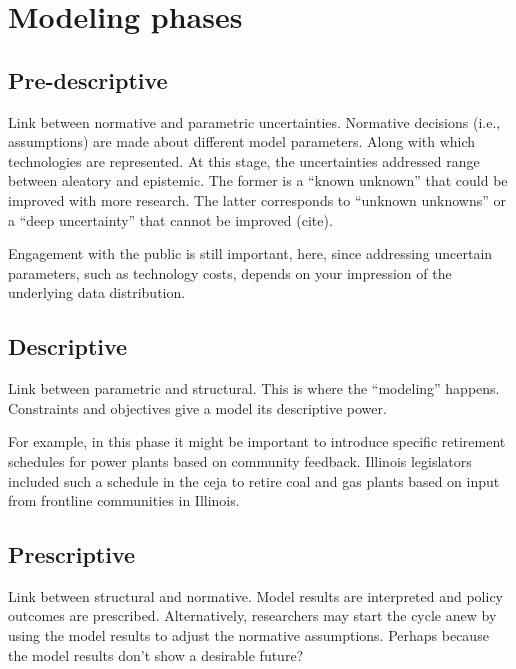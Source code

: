 \section{Modeling phases}
\label{section:modeling-phases}

\subsection{Pre-descriptive}

Link between normative and parametric uncertainties. Normative decisions (i.e.,
assumptions) are made about different model parameters. Along with which
technologies are represented. At this stage, the uncertainties addressed range
between aleatory and epistemic. The former is a ``known unknown'' that could be
improved with more research. The latter corresponds to ``unknown unknowns'' or a
``deep uncertainty'' that cannot be improved (cite).

Engagement with the public is still important, here, since addressing uncertain
parameters, such as technology costs, depends on your impression of the
underlying data distribution.


\subsection{Descriptive}
Link between parametric and structural. This is where the ``modeling'' happens.
Constraints and objectives give a model its descriptive power.

For example, in this phase it might be important to introduce specific
retirement schedules for power plants based on community feedback. Illinois
legislators included such a schedule in the \acf{ceja} to retire coal and gas
plants based on input from frontline communities in Illinois.

\subsection{Prescriptive}
Link between structural and normative. Model results are interpreted and policy
outcomes are prescribed. Alternatively, researchers may start the cycle anew by
using the model results to adjust the normative assumptions. Perhaps because the
model results don't show a desirable future?
